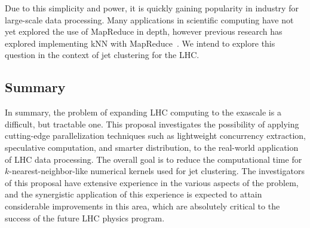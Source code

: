 \documentclass[12pt]{article}
\begin{document}
Due to this simplicity and power, it is quickly gaining popularity in industry
for large-scale data processing. Many applications in scientific computing have not
yet explored the use of MapReduce in depth, however
previous research has explored implementing kNN with
MapReduce~\cite{knn-mapreduce-0, knn-mapreduce-1}. We intend to explore this
question in the context of jet clustering for the LHC.

\subsection{Summary}

In summary, the problem of expanding LHC computing to the exascale is
a difficult, but tractable one. This proposal investigates the
possibility of applying cutting-edge parallelization techniques such
as lightweight concurrency extraction, speculative computation, and
smarter distribution, to the
real-world application of LHC data processing.
The overall goal is to reduce the computational time for
$k$-nearest-neighbor-like numerical kernels used for jet
clustering. The investigators of this
proposal have extensive experience in the various aspects of the
problem, and the synergistic application of this experience is
expected to attain considerable improvements in this area, which
are absolutely critical to the success of the future LHC physics
program. 


{}
%
\end{document}
